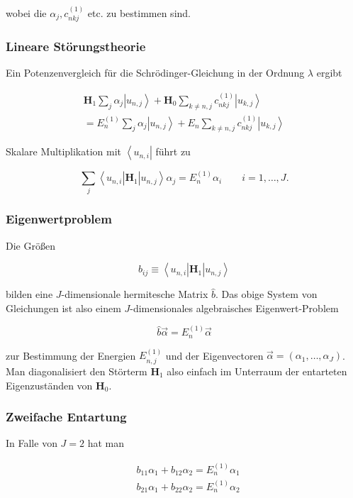 \documentclass[10pt, letterpaper]{article}
\begin{document}
wobei die $\alpha_{j}, c_{n k j}^{(1)}$ etc. zu bestimmen sind.

\subsubsection*{Lineare Störungstheorie}
Ein Potenzenvergleich für die Schrödinger-Gleichung in der Ordnung $\lambda$ ergibt

$$
\begin{array}{r}
\mathbf{H}_{1} \sum_{j} \alpha_{j}\left|u_{n, j}\right\rangle+\mathbf{H}_{0} \sum_{k \neq n, j} c_{n k j}^{(1)}\left|u_{k, j}\right\rangle \\
=E_{n}^{(1)} \sum_{j} \alpha_{j}\left|u_{n, j}\right\rangle+E_{n} \sum_{k \neq n, j} c_{n k j}^{(1)}\left|u_{k, j}\right\rangle
\end{array}
$$

Skalare Multiplikation mit $\left\langle u_{n, i}\right|$ führt zu

$$
\sum_{j}\left\langle u_{n, i}\right| \mathbf{H}_{1}\left|u_{n, j}\right\rangle \alpha_{j}=E_{n}^{(1)} \alpha_{i} \quad \quad i=1, \ldots, J .
$$

\subsubsection*{Eigenwertproblem}
Die Größen

$$
b_{i j} \equiv\left\langle u_{n, i}\right| \mathbf{H}_{1}\left|u_{n, j}\right\rangle
$$

bilden eine $J$-dimensionale hermitesche Matrix $\hat{b}$. Das obige System von Gleichungen ist also einem $J$-dimensionales algebraisches Eigenwert-Problem

$$
\hat{b} \vec{\alpha}=E_{n}^{(1)} \vec{\alpha}
$$

zur Bestimmung der Energien $E_{n, j}^{(1)}$ und der Eigenvectoren $\vec{\alpha}=\left(\alpha_{1}, \ldots, \alpha_{J}\right)$. Man diagonalisiert den Störterm $\mathbf{H}_{1}$ also einfach im Unterraum der entarteten Eigenzuständen von $\mathbf{H}_{0}$.









\subsubsection*{Zweifache Entartung}
In Falle von $J=2$ hat man

$$
\begin{aligned}
& b_{11} \alpha_{1}+b_{12} \alpha_{2}=E_{n}^{(1)} \alpha_{1} \\
& b_{21} \alpha_{1}+b_{22} \alpha_{2}=E_{n}^{(1)} \alpha_{2}
\end{aligned}
$$
\end{document}
